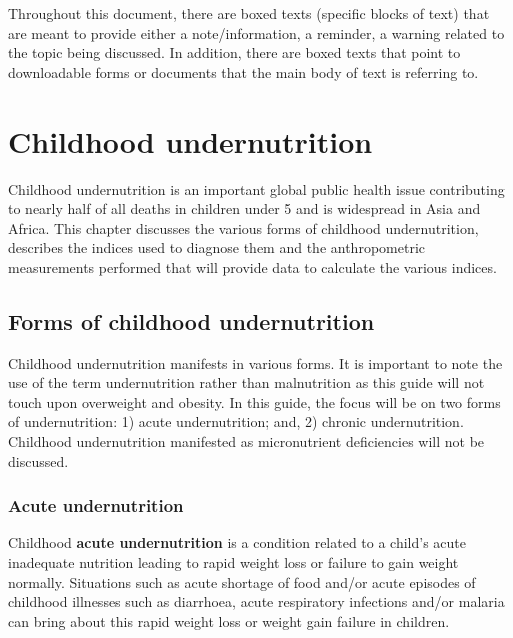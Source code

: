 \documentclass[
  12pt,
]{book}
\begin{document}
Throughout this document, there are boxed texts (specific blocks of text) that are meant to provide either a note/information, a reminder, a warning related to the topic being discussed. In addition, there are boxed texts that point to downloadable forms or documents that the main body of text is referring to.

\hypertarget{anthro}{%
\chapter{Childhood undernutrition}\label{anthro}}

Childhood undernutrition is an important global public health issue contributing to nearly half of all deaths in children under 5 and is widespread in Asia and Africa. This chapter discusses the various forms of childhood undernutrition, describes the indices used to diagnose them and the anthropometric measurements performed that will provide data to calculate the various indices.

\hypertarget{forms-of-childhood-undernutrition}{%
\section{Forms of childhood undernutrition}\label{forms-of-childhood-undernutrition}}

Childhood undernutrition manifests in various forms. It is important to note the use of the term undernutrition rather than malnutrition as this guide will not touch upon overweight and obesity. In this guide, the focus will be on two forms of undernutrition: 1) acute undernutrition; and, 2) chronic undernutrition. Childhood undernutrition manifested as micronutrient deficiencies will not be discussed.

\hypertarget{acute-undernutrition}{%
\subsection{Acute undernutrition}\label{acute-undernutrition}}

Childhood \textbf{acute undernutrition} is a condition related to a child's acute inadequate nutrition leading to rapid weight loss or failure to gain weight normally. Situations such as acute shortage of food and/or acute episodes of childhood illnesses such as diarrhoea, acute respiratory infections and/or malaria can bring about this rapid weight loss or weight gain failure in children.

\newpage
\end{document}
